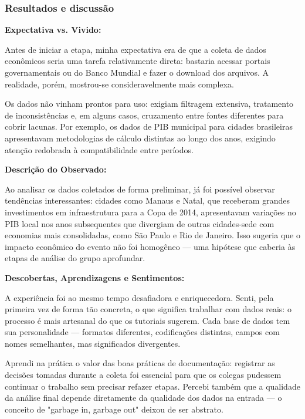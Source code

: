 \documentclass[12pt, a4paper, brazil]{article}
\begin{document}
\subsubsection{Resultados e discussão}
\textbf{Expectativa vs. Vivido:}

Antes de iniciar a etapa, minha expectativa era de que a coleta de dados econômicos seria uma tarefa relativamente direta: bastaria acessar portais governamentais ou do Banco Mundial e fazer o download dos arquivos. A realidade, porém, mostrou-se consideravelmente mais complexa.

Os dados não vinham prontos para uso: exigiam filtragem extensiva, tratamento de inconsistências e, em alguns casos, cruzamento entre fontes diferentes para cobrir lacunas. Por exemplo, os dados de PIB municipal para cidades brasileiras apresentavam metodologias de cálculo distintas ao longo dos anos, exigindo atenção redobrada à compatibilidade entre períodos.

\vspace{0.4cm}
\textbf{Descrição do Observado:}

Ao analisar os dados coletados de forma preliminar, já foi possível observar tendências interessantes: cidades como Manaus e Natal, que receberam grandes investimentos em infraestrutura para a Copa de 2014, apresentavam variações no PIB local nos anos subsequentes que divergiam de outras cidades-sede com economias mais consolidadas, como São Paulo e Rio de Janeiro. Isso sugeria que o impacto econômico do evento não foi homogêneo — uma hipótese que caberia às etapas de análise do grupo aprofundar.

\vspace{0.4cm}
\textbf{Descobertas, Aprendizagens e Sentimentos:}

A experiência foi ao mesmo tempo desafiadora e enriquecedora. Senti, pela primeira vez de forma tão concreta, o que significa trabalhar com dados reais: o processo é mais artesanal do que os tutoriais sugerem. Cada base de dados tem sua personalidade — formatos diferentes, codificações distintas, campos com nomes semelhantes, mas significados divergentes.

Aprendi na prática o valor das boas práticas de documentação: registrar as decisões tomadas durante a coleta foi essencial para que os colegas pudessem continuar o trabalho sem precisar refazer etapas. Percebi também que a qualidade da análise final depende diretamente da qualidade dos dados na entrada — o conceito de "garbage in, garbage out" deixou de ser abstrato.
\end{document}
